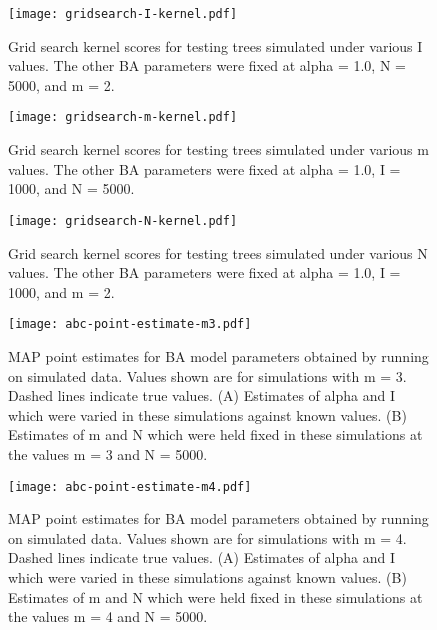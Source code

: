\begin{figure}
  \centering
  \texttt{[image: gridsearch-I-kernel.pdf]}
  \caption{                                              
    Grid search kernel scores for testing trees simulated under various             
    \gls{I} values. The other \gls{BA} parameters were fixed at \gls{alpha} =
    1.0, \gls{N} = 5000, and \gls{m} = 2. 
  }        
  \label{fig:gridI}
\end{figure}

\begin{figure}
  \centering
  \texttt{[image: gridsearch-m-kernel.pdf]}
  \caption{                                              
    Grid search kernel scores for testing trees simulated under various             
    \gls{m} values. The other \gls{BA} parameters were fixed at \gls{alpha} =
    1.0, \gls{I} = 1000, and \gls{N} = 5000.
  }        
  \label{fig:gridm}
\end{figure}

\begin{figure}
  \centering
  \texttt{[image: gridsearch-N-kernel.pdf]}
  \caption{                                              
    Grid search kernel scores for testing trees simulated under various             
    \gls{N} values. The other \gls{BA} parameters were fixed at \gls{alpha} =
    1.0, \gls{I} = 1000, and \gls{m} = 2. 
  }        
  \label{fig:gridN}
\end{figure}

\begin{figure}
  \centering
  \texttt{[image: abc-point-estimate-m3.pdf]}
  \caption{                                              
    \Acrlong{MAP} point estimates for \gls{BA} model parameters obtained by
    running  on simulated data. Values shown are for
    simulations with \gls{m} = 3. Dashed lines indicate true values. (A)
    Estimates of \gls{alpha} and \gls{I} which were varied in these simulations
    against known values. (B) Estimates of \gls{m} and \gls{N} which were held
    fixed in these simulations at the values \gls{m} = 3 and \gls{N} = 5000.
  }        
  \label{fig:abcm3}
\end{figure}

\begin{figure}
  \centering
  \texttt{[image: abc-point-estimate-m4.pdf]}
  \caption{                                              
    \Acrlong{MAP} point estimates for \gls{BA} model parameters obtained by
    running  on simulated data. Values shown are for
    simulations with \gls{m} = 4. Dashed lines indicate true values. (A)
    Estimates of \gls{alpha} and \gls{I} which were varied in these simulations
    against known values. (B) Estimates of \gls{m} and \gls{N} which were held
    fixed in these simulations at the values \gls{m} = 4 and \gls{N} = 5000.
  }        
  \label{fig:abcm4}
\end{figure}
